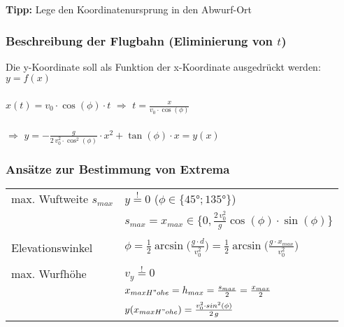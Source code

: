 		\textbf{Tipp:} Lege den Koordinatenursprung in den Abwurf-Ort

		\subsubsection{Beschreibung der Flugbahn (Eliminierung von $t$)}	
			Die y-Koordinate soll als Funktion der x-Koordinate ausgedrückt werden: $y = f(x)$ \\
			\\
			$x(t) = v_0 \cdot \cos(\phi) \cdot t$ \quad $\Rightarrow$ \quad $t = \frac{x}{v_0 \cdot \cos(\phi)}$ \\
			\\
			$\Rightarrow$ \quad $y = - \frac{g}{2 \, v_0^2 \cdot \cos^2(\phi)} \cdot x^2 + \tan(\phi) \cdot x = y(x)$

		\subsubsection{Ansätze zur Bestimmung von Extrema}		
			\begin{tabular}{ll}
				max. Wuftweite $s_{max}$ & $y \overset{!}{=} 0 $ \quad ($\phi \in \{ 45° ; 135° \}$)\\
				& $s_{max} = x_{max} \in \{ 0, \frac{2 \, v_0^2}{g} \cos(\phi) \cdot \sin(\phi) \}$ \\
				\\
				Elevationswinkel & $\phi = \frac{1}{2} \arcsin \big( \frac{g \cdot d}{v_0^2} \big) = \frac{1}{2} \arcsin \big( \frac{g \cdot x_{max}}{v_0^2} \big)$ \\
				\\
				max. Wurfhöhe & $v_y \overset{!}{=} 0 $ \\
				& $x_{maxH"ohe} =  h_{max} = \frac{s_{max}}{2} = \frac{x_{max}}{2}$ \\
				& $y(x_{maxH"ohe}) = \frac{v_0^2 \cdot sin^2(\phi)}{2 \, g}$
			\end{tabular}
